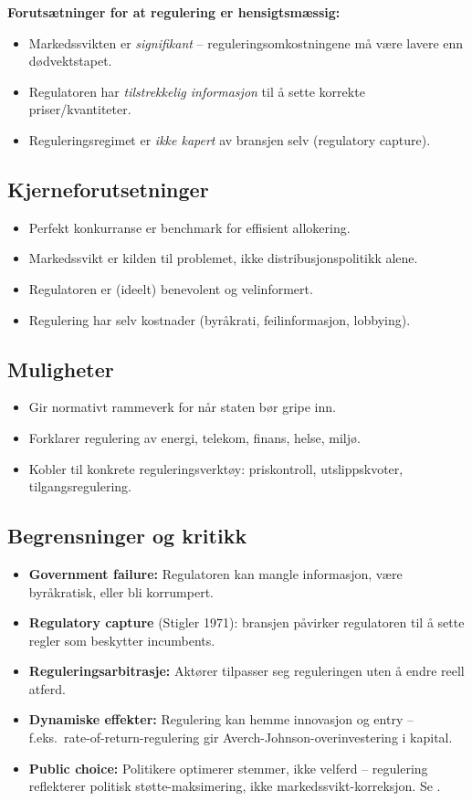 \textbf{Forutsætninger for at regulering er hensigtsmæssig:}
\begin{itemize}\setlength{\itemsep}{1pt}
\item Markedssvikten er \emph{signifikant} -- reguleringsomkostningene må være lavere enn dødvektstapet.
\item Regulatoren har \emph{tilstrekkelig informasjon} til å sette korrekte priser/kvantiteter.
\item Reguleringsregimet er \emph{ikke kapert} av bransjen selv (regulatory capture).
\end{itemize}

\subsection*{Kjerneforutsetninger}
\begin{itemize}
\item Perfekt konkurranse er benchmark for effisient allokering.
\item Markedssvikt er kilden til problemet, ikke distribusjonspolitikk alene.
\item Regulatoren er (ideelt) benevolent og velinformert.
\item Regulering har selv kostnader (byråkrati, feilinformasjon, lobbying).
\end{itemize}

\subsection*{Muligheter}
\begin{itemize}
\item Gir normativt rammeverk for når staten bør gripe inn.
\item Forklarer regulering av energi, telekom, finans, helse, miljø.
\item Kobler til konkrete reguleringsverktøy: priskontroll, utslippskvoter, tilgangsregulering.
\end{itemize}

\subsection*{Begrensninger og kritikk}
\begin{itemize}
\item \textbf{Government failure:} Regulatoren kan mangle informasjon, være byråkratisk, eller bli korrumpert.
\item \textbf{Regulatory capture} (Stigler 1971): bransjen påvirker regulatoren til å sette regler som beskytter incumbents.
\item \textbf{Reguleringsarbitrasje:} Aktører tilpasser seg reguleringen uten å endre reell atferd.
\item \textbf{Dynamiske effekter:} Regulering kan hemme innovasjon og entry -- f.eks.\ rate-of-return-regulering gir Averch-Johnson-overinvestering i kapital.
\item \textbf{Public choice:} Politikere optimerer stemmer, ikke velferd -- regulering reflekterer politisk støtte-maksimering, ikke markedssvikt-korreksjon. Se .
\end{itemize}

